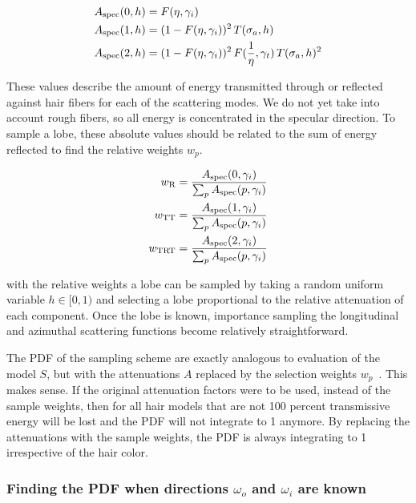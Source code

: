 \documentclass[11pt,a4paper]{report}
\begin{document}
\begin{align}
A_{\textnormal{spec}}(0, h) &= F(\eta, \gamma_i) \\
A_{\textnormal{spec}}(1, h) &= (1 - F(\eta, \gamma_i))^2 \, T(\sigma_a, h) \\
A_{\textnormal{spec}}(2, h) &= (1 - F(\eta, \gamma_i))^2 \, F(\frac{1}{\eta}, \gamma_t) \, T(\sigma_a, h)^2
\end{align}

These values describe the amount of energy transmitted through or reflected against hair fibers for each of the scattering modes. We do not yet take into account rough fibers, so all energy is concentrated in the specular direction. To sample a lobe, these absolute values should be related to the sum of energy reflected to find the relative weights $w_p$.

\begin{align}
w_{\textnormal{R}} &= \frac{A_{\textnormal{spec}}(0, \gamma_i)}{\sum_p A_{\textnormal{spec}}(p, \gamma_i)} \\
w_{\textnormal{TT}} &= \frac{A_{\textnormal{spec}}(1, \gamma_i)}{\sum_p A_{\textnormal{spec}}(p, \gamma_i)} \\
w_{\textnormal{TRT}} &= \frac{A_{\textnormal{spec}}(2, \gamma_i)}{\sum_p A_{\textnormal{spec}}(p, \gamma_i)}
\end{align}

with the relative weights a lobe can be sampled by taking a random uniform variable $h \in [0, 1)$ and selecting a lobe proportional to the relative attenuation of each component. Once the lobe is known, importance sampling the longitudinal and azimuthal scattering functions become relatively straightforward.

The PDF of the sampling scheme are exactly analogous to evaluation of the model $S$, but with the attenuations $A$ replaced by the selection weights $w_p$~\cite{eon2013}. This makes sense. If the original attenuation factors were to be used, instead of the sample weights, then for all hair models that are not 100 percent transmissive energy will be lost and the PDF will not integrate to 1 anymore. By replacing the attenuations with the sample weights, the PDF is always integrating to 1 irrespective of the hair color.


\subsubsection{Finding the PDF when directions $\omega_o$ and $\omega_i$ are known}
\end{document}
